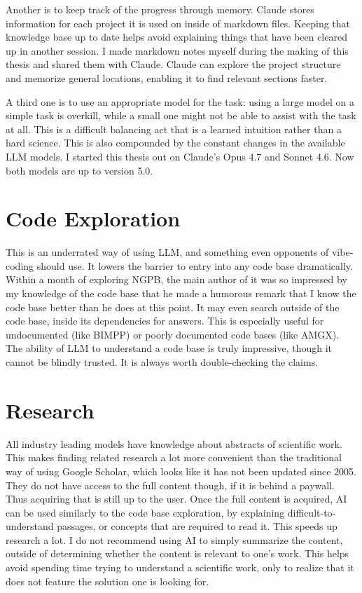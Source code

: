 Another is to keep track of the progress through memory.
Claude stores information for each project it is used on inside of markdown files.
Keeping that knowledge base up to date helps avoid explaining things that have been cleared up in another session.
I made markdown notes myself during the making of this thesis and shared them with Claude.
Claude can explore the project structure and memorize general locations, enabling it to find relevant sections faster.

A third one is to use an appropriate model for the task: using a large model on a simple task is overkill, while a small one might not be able to assist with the task at all.
This is a difficult balancing act that is a learned intuition rather than a hard science.
This is also compounded by the constant changes in the available LLM models. 
I started this thesis out on Claude's Opus 4.7 and Sonnet 4.6.
Now both models are up to version 5.0.

\section{Code Exploration}

This is an underrated way of using LLM, and something even opponents of vibe-coding should use.
It lowers the barrier to entry into any code base dramatically.
Within a month of exploring NGPB, the main author of it was so impressed by my knowledge of the code base that he made a humorous remark that I know the code base better than he does at this point.
It may even search outside of the code base, inside its dependencies for answers.
This is especially useful for undocumented (like BIMPP) or poorly documented code bases (like AMGX).
The ability of LLM to understand a code base is truly impressive, though it cannot be blindly trusted.
It is always worth double-checking the claims.

\section{Research}

All industry leading models have knowledge about abstracts of scientific work.
This makes finding related research a lot more convenient than the traditional way of using Google Scholar, which looks like it has not been updated since 2005.
They do not have access to the full content though, if it is behind a paywall.
Thus acquiring that is still up to the user.
Once the full content is acquired, AI can be used similarly to the code base exploration, by explaining difficult-to-understand passages, or concepts that are required to read it.
This speeds up research a lot.
I do not recommend using AI to simply summarize the content, outside of determining whether the content is relevant to one's work.
This helps avoid spending time trying to understand a scientific work, only to realize that it does not feature the solution one is looking for.

